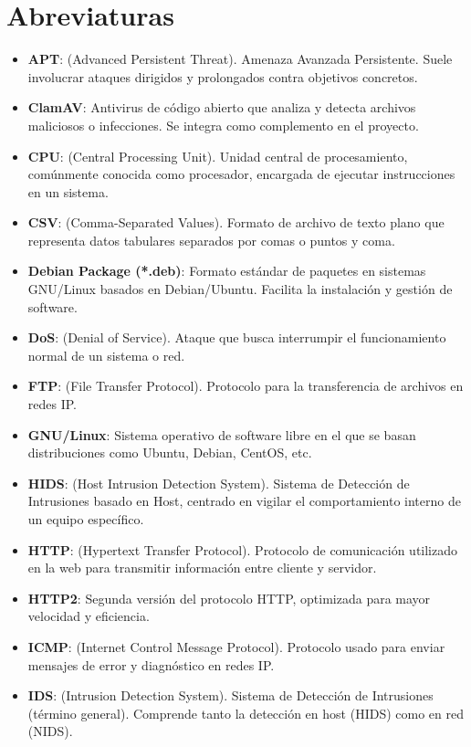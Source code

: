 \documentclass[11pt,a4paper,twoside]{report}
\begin{document}
\chapter*{Abreviaturas}
\begin{itemize}
	\item \textbf{APT}: (Advanced Persistent Threat). Amenaza Avanzada Persistente. Suele involucrar ataques dirigidos y prolongados contra objetivos concretos.
	\item \textbf{ClamAV}: Antivirus de código abierto que analiza y detecta archivos maliciosos o infecciones. Se integra como complemento en el proyecto.
	\item \textbf{CPU}: (Central Processing Unit). Unidad central de procesamiento, comúnmente conocida como procesador, encargada de ejecutar instrucciones en un sistema.
	\item \textbf{CSV}: (Comma-Separated Values). Formato de archivo de texto plano que representa datos tabulares separados por comas o puntos y coma.
	\item \textbf{Debian Package (*.deb)}: Formato estándar de paquetes en sistemas GNU/Linux basados en Debian/Ubuntu. Facilita la instalación y gestión de software.
	\item \textbf{DoS}: (Denial of Service). Ataque que busca interrumpir el funcionamiento normal de un sistema o red.
	\item \textbf{FTP}: (File Transfer Protocol). Protocolo para la transferencia de archivos en redes IP.
	\item \textbf{GNU/Linux}: Sistema operativo de software libre en el que se basan distribuciones como Ubuntu, Debian, CentOS, etc.
	\item \textbf{HIDS}: (Host Intrusion Detection System). Sistema de Detección de Intrusiones basado en Host, centrado en vigilar el comportamiento interno de un equipo específico.
	\item \textbf{HTTP}: (Hypertext Transfer Protocol). Protocolo de comunicación utilizado en la web para transmitir información entre cliente y servidor.
	\item \textbf{HTTP2}: Segunda versión del protocolo HTTP, optimizada para mayor velocidad y eficiencia.
	\item \textbf{ICMP}: (Internet Control Message Protocol). Protocolo usado para enviar mensajes de error y diagnóstico en redes IP.
	\item \textbf{IDS}: (Intrusion Detection System). Sistema de Detección de Intrusiones (término general). Comprende tanto la detección en host (HIDS) como en red (NIDS).

\end{itemize}
\end{document}
